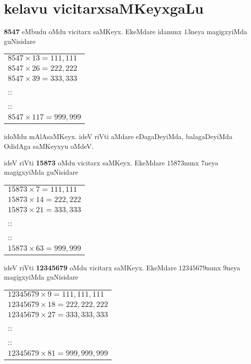 \chapter{kelavu vicitarxsaMKeyxgaLu}\label{chap11}


\noindent
{\rm\bfseries 8547} eMbudu oMdu vicitarx saMKeyx. EkeMdare idanunx $13$neya magigxyiMda guNi\-sidare
\begin{center}
\begin{tabular}{l}
$8547\times 13=111,111$\\[2pt]
$8547\times 26=222,222$\\[2pt]
$8547\times 39=333,333$\\[2pt]
::\\
::\\
{\small $8547\times 117=999,999$}
\end{tabular}
\end{center}

idoMdu mAlAsaMKeyx. ideV riVti aMdare eDagaDeyiMda, balagaDe\-yiMda OdidAga saMKeyxyu oMdeV.

\smallskip

ideV riVti {\rm\bfseries 15873} oMdu \hbox{vicitarx} saMKeyx. EkeMdare $15873$nunx $7$neya magigxyiMda guNisidare
\begin{center}
\begin{tabular}{l}
$15873\times 7=111,111$\\[2pt]
$15873\times 14=222,222$\\[2pt]
$15873\times 21=333,333$\\[2pt]
::\\
::\\
{\small $15873\times 63=999,999$}
\end{tabular}
\end{center}

\eject

ideV riVti {\rm\bfseries 12345679} oMdu \hbox{vicitarx} saMKeyx. EkeMdare $12345679$nunx $9$neya magigxyiMda guNisidare
\begin{center}
{\fontsize{11}{13}\selectfont
\begin{tabular}{l}
$12345679\times 9=111,111,111$\\[2pt]
$12345679\times 18=222,222,222$\\[2pt]
$12345679\times 27=333,333,333$\\[2pt]
::\\
::\\
{\small $12345679\times 81=999,999,999$}
\end{tabular}}
\end{center}

